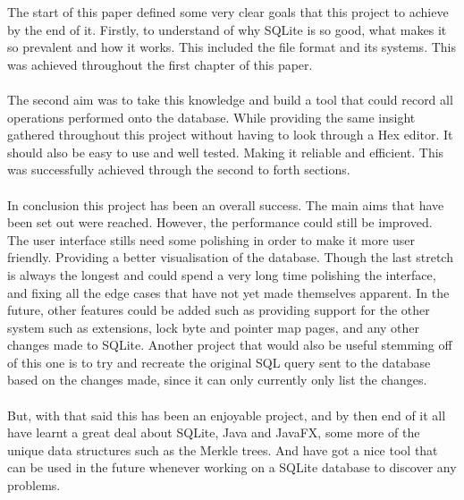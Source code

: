 The start of this paper defined some very clear goals that this project to achieve by the end of it. Firstly, to understand of why SQLite is so good, what makes it so prevalent and how it works. This included the file format and its systems. This was achieved throughout the first chapter of this paper. 
\\\\
The second aim was to take this knowledge and build a tool that could record all operations performed onto the database. While providing the same insight gathered throughout this project without having to look through a Hex editor. It should also be easy to use and well tested. Making it reliable and efficient. This was successfully achieved through the second to forth sections.
\\\\
In conclusion this project has been an overall success. The main aims that have been set out were reached. However, the performance could still be improved. The user interface stills need some polishing in order to make it more user friendly. Providing a better visualisation of the database. Though the last stretch is always the longest and could spend a very long time polishing the  interface, and fixing all the edge cases that have not yet made themselves apparent. In the future, other features could be added such as providing support for the other system such as  extensions, lock byte and pointer map pages, and any other changes made to SQLite. Another project that would also be useful stemming off of this one is to try and recreate the original SQL query sent to the database based on the changes made, since it can only currently only list the changes. 
\\\\
But, with that said this has been an enjoyable project, and by then end of it all have learnt a great deal about SQLite, Java and JavaFX, some more of the unique data structures such as the Merkle trees. And have got a nice tool that can be used in the future whenever working on a SQLite database to discover any problems.